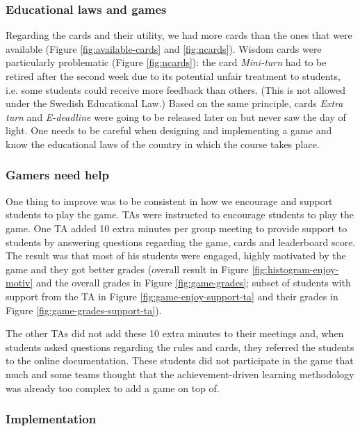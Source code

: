 \documentclass[
]{article}
\begin{document}
\subsubsection*{Educational laws and games}

Regarding the cards and their utility, we had more cards than the ones
that were available (Figure \ref{fig:available-cards} and
\ref{fig:ncards}). Wisdom cards were particularly problematic (Figure
\ref{fig:ncards}): the card \emph{Mini-turn} had to be retired after the
second week due to its potential unfair treatment to students, i.e. some
students could receive more feedback than others. (This is not allowed
under the Swedish Educational Law.) Based on the same principle, cards
\emph{Extra turn} and \emph{E-deadline} were going to be released later
on but never saw the day of light. One needs to be careful when
designing and implementing a game and know the educational laws of the
country in which the course takes place.

\hypertarget{gamers-need-help}{%
\subsubsection*{Gamers need help}\label{gamers-need-help}}

One thing to improve was to be consistent in how we encourage and
support students to play the game. TAs were instructed to encourage
students to play the game. One TA added 10 extra minutes per group
meeting to provide support to students by answering questions regarding
the game, cards and leaderboard score. The result was that most of his
students were engaged, highly motivated by the game and they got better
grades (overall result in Figure \ref{fig:histogram-enjoy-motiv} and the
overall grades in Figure \ref{fig:game-grades}; subset of students with
support from the TA in Figure \ref{fig:game-enjoy-support-ta} and their
grades in Figure \ref{fig:game-grades-support-ta}).

The other TAs did not add these 10 extra minutes to their meetings and,
when students asked questions regarding the rules and cards, they
referred the students to the online documentation. These students did
not participate in the game that much and some teams thought that the
achievement-driven learning methodology was already too complex to add a
game on top of.

\hypertarget{implementation}{%
\subsubsection*{Implementation}\label{implementation}}
\end{document}
